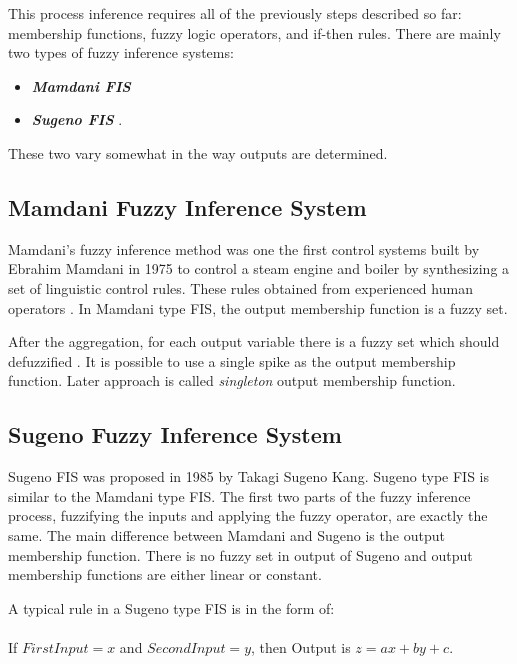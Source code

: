 \documentclass{article}
\begin{document}
This process inference requires all of the previously steps described so far:
membership functions, fuzzy logic operators, and if-then rules.
There are mainly two types of fuzzy inference systems\cite{A_Computational_Approach_to_Learning_and_Machine_Intelligence}:

\begin{itemize}
\item  \textbf{\emph{ Mamdani FIS}}\cite{MamdaniA75} 
\item \textbf{\emph{ Sugeno FIS}} \cite{Industrial_Applications_of_Fuzzy_Control}. 
\end{itemize}
These two vary somewhat in the way outputs are determined.





\subsection{Mamdani Fuzzy Inference System}

Mamdani’s fuzzy inference method was one the first control systems built by Ebrahim Mamdani
in 1975 to control a steam engine and boiler by synthesizing a set of linguistic
control rules. These rules obtained from experienced human operators \cite{MamdaniA75}.
In Mamdani type FIS, the output membership function is a fuzzy set.



After the aggregation, for each output variable there is a fuzzy set which should defuzzified . It is possible to use a single spike as the output membership function.
Later approach is called \emph{singleton} output membership function. 


\subsection{Sugeno Fuzzy Inference System}


Sugeno FIS was proposed  in 1985  \cite{Industrial_Applications_of_Fuzzy_Control}
by Takagi Sugeno Kang. Sugeno type FIS is similar to the Mamdani type FIS. The first two parts of the fuzzy inference process, fuzzifying the inputs and applying the fuzzy operator, are exactly the same.
The main difference between Mamdani and Sugeno is the output membership function.
There is no fuzzy set in output of Sugeno and output membership functions are either linear or constant.

A typical rule in a Sugeno type FIS is in the form of:
\\
\\
If $First Input = x$ and $Second Input = y$, then Output is $z = ax + by + c$.
\end{document}
